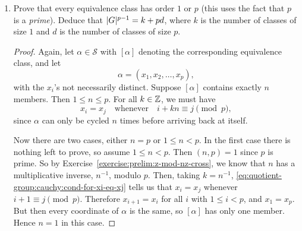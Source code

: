 \begin{enumerate}
\begin{proof}
    Conversely, if $\alpha$ has the form $(x,x,\dots,x)$ with all
    coordinates the same, then every cyclic permutation of $\alpha$
    will leave $\alpha$ unchanged. Therefore $[\alpha]$ contains only
    the one element.
  \end{proof}
\item Prove that every equivalence class has order $1$ or $p$ (this
  uses the fact that $p$ is a {\em prime}). Deduce that
  $\lvert{G}\rvert^{p-1} = k + pd$, where $k$ is the number of classes of size
  $1$ and $d$ is the number of classes of size $p$.
  \begin{proof}
    Again, let $\alpha\in\mathcal{S}$ with $[\alpha]$ denoting the
    corresponding equivalence class, and let
    \begin{equation*}
      \alpha = (x_1,x_2,\dots,x_p),
    \end{equation*}
    with the $x_i$'s not necessarily distinct. Suppose $[\alpha]$
    contains exactly $n$ members. Then $1\leq n\leq p$. For all
    $k\in\mathbb{Z}$, we must have
    \begin{equation}
      \label{eq:quotient-group:cauchy:cond-for-xi-eq-xj}
      x_i = x_j
      \quad\text{whenever}\quad
      i + kn \equiv j \pmod{p},
    \end{equation}
    since $\alpha$ can only be cycled $n$ times before arriving back
    at itself.

    Now there are two cases, either $n = p$ or $1\leq n<p$. In the
    first case there is nothing left to prove, so assume $1\leq
    n<p$. Then $(n,p) = 1$ since $p$ is prime. So by
    Exercise~\ref{exercise:prelim:z-mod-nz-cross}, we know that $n$
    has a multiplicative inverse, $n^{-1}$, modulo $p$. Then, taking
    $k = n^{-1}$, \eqref{eq:quotient-group:cauchy:cond-for-xi-eq-xj}
    tells us that $x_i = x_j$ whenever $i+1\equiv
    j\pmod{p}$. Therefore $x_{i+1} = x_i$ for all $i$ with
    $1\leq i<p$, and $x_1 = x_p$. But then every coordinate of
    $\alpha$ is the same, so $[\alpha]$ has only one member. Hence
    $n = 1$ in this case.


\end{proof}
\end{enumerate}
